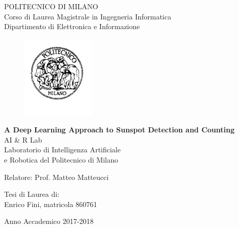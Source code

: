 \thispagestyle{empty}
\vspace*{-1.5cm} \bfseries{
\begin{center}
  \large
  POLITECNICO DI MILANO\\
  \normalsize
  Corso di Laurea Magistrale in Ingegneria Informatica\\
  Dipartimento di Elettronica e Informazione\\
  \begin{figure}[htbp]
    \begin{center}
      \includegraphics[width=3.5cm]{./pictures/logopm}
    \end{center}
  \end{figure}
  \vspace*{0.3cm} \LARGE



  \textbf{A Deep Learning Approach to Sunspot Detection and Counting}\\



  \vspace*{.75truecm} \large
  AI \& R Lab \\
  Laboratorio di Intelligenza Artificiale \\
  e Robotica del Politecnico di Milano
\end{center}
\vspace*{3.0cm} \large
\begin{flushleft}


  Relatore: Prof. Matteo Matteucci \\

\end{flushleft}
\vspace*{1.0cm}
\begin{flushright}


  Tesi di Laurea di:\\ Enrico Fini, matricola 860761\\


\end{flushright}
\vspace*{1.0cm}
\begin{center}



  Anno Accademico 2017-2018
\end{center} \clearpage
}
